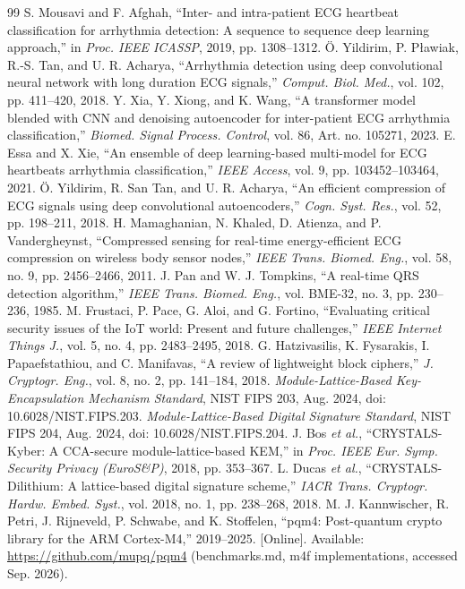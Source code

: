 \documentclass[journal]{IEEEtran}
\begin{document}
\begin{thebibliography}{99}
 S. Mousavi and F. Afghah, ``Inter- and intra-patient ECG heartbeat classification for arrhythmia detection: A sequence to sequence deep learning approach,'' in \emph{Proc. IEEE ICASSP}, 2019, pp. 1308--1312.
 \"O. Yildirim, P. P\l awiak, R.-S. Tan, and U. R. Acharya, ``Arrhythmia detection using deep convolutional neural network with long duration ECG signals,'' \emph{Comput. Biol. Med.}, vol. 102, pp. 411--420, 2018.
 Y. Xia, Y. Xiong, and K. Wang, ``A transformer model blended with CNN and denoising autoencoder for inter-patient ECG arrhythmia classification,'' \emph{Biomed. Signal Process. Control}, vol. 86, Art. no. 105271, 2023.
 E. Essa and X. Xie, ``An ensemble of deep learning-based multi-model for ECG heartbeats arrhythmia classification,'' \emph{IEEE Access}, vol. 9, pp. 103452--103464, 2021.
 \"O. Yildirim, R. San Tan, and U. R. Acharya, ``An efficient compression of ECG signals using deep convolutional autoencoders,'' \emph{Cogn. Syst. Res.}, vol. 52, pp. 198--211, 2018.
 H. Mamaghanian, N. Khaled, D. Atienza, and P. Vandergheynst, ``Compressed sensing for real-time energy-efficient ECG compression on wireless body sensor nodes,'' \emph{IEEE Trans. Biomed. Eng.}, vol. 58, no. 9, pp. 2456--2466, 2011.
 J. Pan and W. J. Tompkins, ``A real-time QRS detection algorithm,'' \emph{IEEE Trans. Biomed. Eng.}, vol. BME-32, no. 3, pp. 230--236, 1985.
 M. Frustaci, P. Pace, G. Aloi, and G. Fortino, ``Evaluating critical security issues of the IoT world: Present and future challenges,'' \emph{IEEE Internet Things J.}, vol. 5, no. 4, pp. 2483--2495, 2018.
 G. Hatzivasilis, K. Fysarakis, I. Papaefstathiou, and C. Manifavas, ``A review of lightweight block ciphers,'' \emph{J. Cryptogr. Eng.}, vol. 8, no. 2, pp. 141--184, 2018.
 \emph{Module-Lattice-Based Key-Encapsulation Mechanism Standard}, NIST FIPS 203, Aug. 2024, doi: 10.6028/NIST.FIPS.203.
 \emph{Module-Lattice-Based Digital Signature Standard}, NIST FIPS 204, Aug. 2024, doi: 10.6028/NIST.FIPS.204.
 J. Bos \emph{et al.}, ``CRYSTALS-Kyber: A CCA-secure module-lattice-based KEM,'' in \emph{Proc. IEEE Eur. Symp. Security Privacy (EuroS\&P)}, 2018, pp. 353--367.
 L. Ducas \emph{et al.}, ``CRYSTALS-Dilithium: A lattice-based digital signature scheme,'' \emph{IACR Trans. Cryptogr. Hardw. Embed. Syst.}, vol. 2018, no. 1, pp. 238--268, 2018.
 M. J. Kannwischer, R. Petri, J. Rijneveld, P. Schwabe, and K. Stoffelen, ``pqm4: Post-quantum crypto library for the ARM Cortex-M4,'' 2019--2025. [Online]. Available: \url{https://github.com/mupq/pqm4} (benchmarks.md, m4f implementations, accessed Sep. 2026).

\end{thebibliography}
\end{document}
